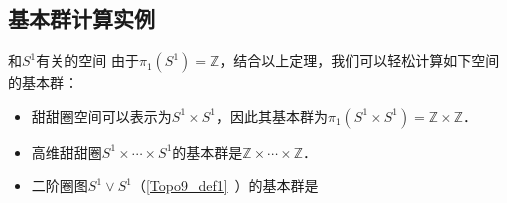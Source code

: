 \subsection{基本群计算实例}

\begin{example}{和$S^1$有关的空间}
由于$\pi_1(S^1)=\mathbb{Z}$，结合以上定理，我们可以轻松计算如下空间的基本群：
\begin{itemize}
\item 甜甜圈空间可以表示为$S^1\times S^1$，因此其基本群为$\pi_1(S^1\times S^1)=\mathbb{Z}\times\mathbb{Z}$．
\item 高维甜甜圈$S^1\times\cdots\times S^1$的基本群是$\mathbb{Z}\times\cdots\times\mathbb{Z}$．
\item 二阶圈图$S^1\vee S^1$（\autoref{Topo9_def1}~）的基本群是
\end{itemize}

\end{example}



